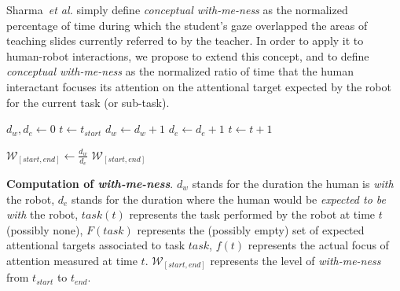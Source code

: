 \documentclass{sig-alternate}
\newcommand{\etal}{\textit{et al.}\xspace}
\begin{document}
Sharma~\etal simply define \emph{conceptual with-me-ness} as the normalized
percentage of time during which the student's gaze overlapped the areas of
teaching slides currently referred to by the teacher.
In order to apply it to human-robot interactions, we propose to extend this
concept, and to define \emph{conceptual with-me-ness} as the normalized
ratio of time that the human interactant focuses its attention on the
attentional target expected by the robot for the current task (or sub-task).


\begin{algorithm}[h!]
    \centering

    \begin{algorithmic}[1]
     {}
    \State $d_w, d_e \gets 0$
    \State $t \gets t_{start}$
    \Repeat
     \label{algline:skiplosttrack}
            \State $d_w \gets d_w + 1$
        \EndIf
        \State $d_e \gets d_e + 1$
    \EndIf
    \State $t \gets t + 1$

    \State $\mathcal{W}_{[start, end]} \gets \frac{d_w}{d_e}$
    \State \Return $\mathcal{W}_{[start, end]}$
    \EndProcedure

    \end{algorithmic}

    \caption{\textbf{Computation of \emph{with-me-ness}}. $d_w$ stands for the duration
        the human is \emph{with} the robot, $d_e$ stands for the duration where
        the human would be \emph{expected to be with} the robot, $task(t)$
        represents the task performed by the robot at time $t$ (possibly none),
        $F(task)$ represents the (possibly empty) set of expected attentional
        targets associated to task $task$, $f(t)$ represents the actual focus of
        attention measured at time $t$. $\mathcal{W}_{[start, end]}$ represents
        the level of \emph{with-me-ness} from $t_{start}$ to $t_{end}$.}
    \label{alg:with-me-ness}
\end{algorithm}
\end{document}
